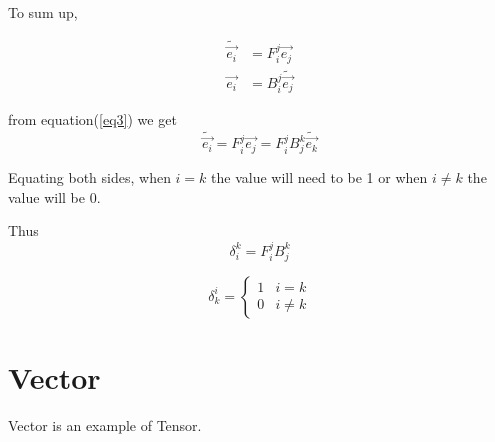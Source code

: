 \documentclass{article}
\begin{document}
	To sum up, 
		
		\begin{tcolorbox}
			\begin{equation}
				\begin{split}
					\widetilde{\overrightarrow{e_{i}}} &= F_{i}^{j}\overrightarrow{e_{j}}\\
					\overrightarrow{e_{i}} &= B_{i}^{j}\widetilde{\overrightarrow{e_{j}}}
				\end{split}\label{eq3}
			\end{equation}
		\end{tcolorbox}
	
	from equation(\ref{eq3}) we get $$\widetilde{\overrightarrow{e_{i}}} = F_{i}^{j}\overrightarrow{e_{j}} = F_{i}^{j}B_{j}^{k}\widetilde{\overrightarrow{e_{k}}}$$
	
	Equating both sides, when $i = k$ the value will need to be 1 or when $i \neq k$ the value will be 0.
	
	Thus $$\delta^{k}_{i} = F_{i}^{j}B_{j}^{k}$$
	
	\begin{tcolorbox}
		\begin{center}
			\begin{equation}
				\delta_{k}^{i} = \begin{cases}
					1 & i = k \\
					0 & i \neq k 
				\end{cases}\label{eq4}
			\end{equation} 
		\end{center}
	\end{tcolorbox}	

	\section*{Vector}
	Vector is an example of Tensor.
	
\end{document}

